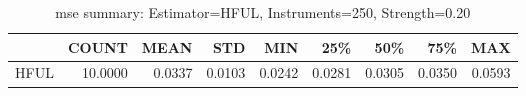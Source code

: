 \begin{table}[ht]
\centering
\caption{mse summary: Estimator=HFUL, Instruments=250, Strength=0.20}
\begin{tabular}{lrrrrrrrr}
\toprule
 & COUNT & MEAN & STD & MIN & 25\% & 50\% & 75\% & MAX \\
\midrule
HFUL & 10.0000 & 0.0337 & 0.0103 & 0.0242 & 0.0281 & 0.0305 & 0.0350 & 0.0593 \\
\bottomrule
\end{tabular}
\end{table}
